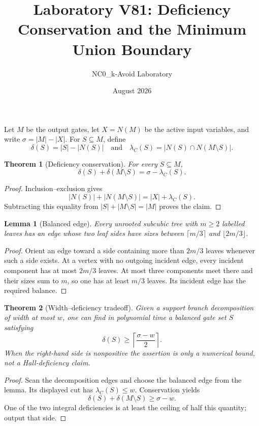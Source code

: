 \documentclass[11pt]{article}
\title{Laboratory V81: Deficiency Conservation and the Minimum Union Boundary}
\author{NC0\_k-Avoid Laboratory}
\date{August 2026}
\newtheorem{theorem}{Theorem}
\newtheorem{lemma}{Lemma}
\begin{document}
\maketitle

Let $M$ be the output gates, let $X=N(M)$ be the active input variables, and
write $\sigma=|M|-|X|$.  For $S\subseteq M$, define
\[
 \delta(S)=|S|-|N(S)|
 \quad\text{and}\quad
 \lambda_C(S)=|N(S)\cap N(M\setminus S)|.
\]

\begin{theorem}[Deficiency conservation]
For every $S\subseteq M$,
\[
 \delta(S)+\delta(M\setminus S)=\sigma-\lambda_C(S).
\]
\end{theorem}

\begin{proof}
Inclusion--exclusion gives
\[
 |N(S)|+|N(M\setminus S)|=|X|+\lambda_C(S).
\]
Subtracting this equality from $|S|+|M\setminus S|=|M|$ proves the claim.
\end{proof}

\begin{lemma}[Balanced edge]
Every unrooted subcubic tree with $m\geq2$ labelled leaves has an edge whose
two leaf sides have sizes between $\lceil m/3\rceil$ and
$\lfloor2m/3\rfloor$.
\end{lemma}

\begin{proof}
Orient an edge toward a side containing more than $2m/3$ leaves whenever such
a side exists.  At a vertex with no outgoing incident edge, every incident
component has at most $2m/3$ leaves.  At most three components meet there and
their sizes sum to $m$, so one has at least $m/3$ leaves.  Its incident edge
has the required balance.
\end{proof}

\begin{theorem}[Width--deficiency tradeoff]
Given a support branch decomposition of width at most $w$, one can find in
polynomial time a balanced gate set $S$ satisfying
\[
 \delta(S)\geq \left\lceil\frac{\sigma-w}{2}\right\rceil.
\]
When the right-hand side is nonpositive the assertion is only a numerical
bound, not a Hall-deficiency claim.
\end{theorem}

\begin{proof}
Scan the decomposition edges and choose the balanced edge from the lemma.
Its displayed cut has $\lambda_C(S)\leq w$.  Conservation yields
\[
 \delta(S)+\delta(M\setminus S)\geq\sigma-w.
\]
One of the two integral deficiencies is at least the ceiling of half this
quantity; output that side.
\end{proof}
\end{document}
